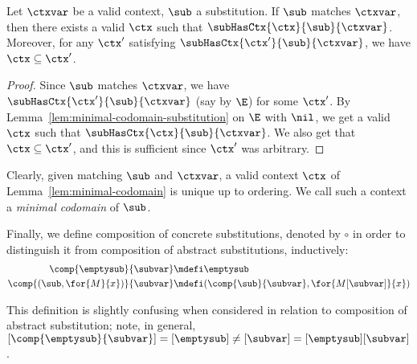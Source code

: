 \begin{lemma}
\label{lem:minimal-codomain}
Let $\ctxvar$ be a valid context, $\sub$ a substitution.
If $\sub$ matches $\ctxvar$, then there exists a valid $\ctx$ such that $\subHasCtx{\ctx}{\sub}{\ctxvar}$.
Moreover, for any $\ctx'$ satisfying $\subHasCtx{\ctx'}{\sub}{\ctxvar}$, we have $\ctx \subseteq \ctx'$.
\end{lemma}

\begin{proof}
Since $\sub$ matches $\ctxvar$, we have $\subHasCtx{\ctx'}{\sub}{\ctxvar}$ (say by $\E$) for some $\ctx'$.
By Lemma~\ref{lem:minimal-codomain-substitution} on $\E$ with $\nil$, we get a valid $\ctx$ such that $\subHasCtx{\ctx}{\sub}{\ctxvar}$.
We also get that $\ctx \subseteq \ctx'$, and this is sufficient since $\ctx'$ was arbitrary.
\end{proof}

Clearly, given matching $\sub$ and $\ctxvar$, a valid context $\ctx$ of Lemma~\ref{lem:minimal-codomain} is unique up to ordering.
We call such a context a \emph{minimal codomain} of $\sub$.

Finally, we define composition of concrete substitutions, denoted by $\circ$ in order to distinguish it from composition of abstract substitutions, inductively:
\begin{align*}
\comp{\emptysub}{\subvar} &\mdefi \emptysub \\
\comp{(\sub, \for{M}{x})}{\subvar} &\mdefi (\comp{\sub}{\subvar}, \for{M[\subvar]}{x})
\end{align*}

This definition is slightly confusing when considered in relation to composition of abstract substitution; note, in general, $[\comp{\emptysub}{\subvar}] = [\emptysub] \neq [\subvar] = [\emptysub][\subvar]$.

